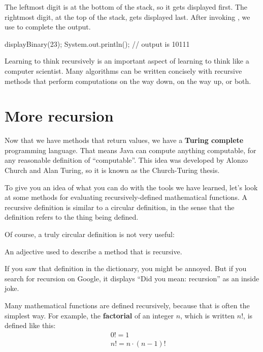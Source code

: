 The leftmost digit is at the bottom of the stack, so it gets displayed first.
The rightmost digit, at the top of the stack, gets displayed last.
After invoking , we use  to complete the output.

\begin{code}
displayBinary(23);
System.out.println();
// output is 10111
\end{code}

Learning to think recursively is an important aspect of learning to think like a computer scientist.
Many algorithms can be written concisely with recursive methods that perform computations on the way down, on the way up, or both.


\section{More recursion}
\label{factorial}



Now that we have methods that return values, we have a {\bf Turing complete} programming language.
That means Java can compute anything computable, for any reasonable definition of ``computable''.
This idea was developed by Alonzo Church and Alan Turing, so it is known as the Church-Turing thesis.


To give you an idea of what you can do with the tools we have learned, let's look at some methods for evaluating recursively-defined mathematical functions.
A recursive definition is similar to a circular definition, in the sense that the definition refers to the thing being defined.

Of course, a truly circular definition is not very useful:

\begin{description}
 An adjective used to describe a method that is recursive.
\end{description}

If you saw that definition in the dictionary, you might be annoyed.
But if you search for recursion on Google, it displays ``Did you mean: recursion'' as an inside joke.


Many mathematical functions are defined recursively, because that is often the simplest way.
For example, the {\bf factorial} of an integer $n$, which is written $n!$, is defined like this:
%
\begin{eqnarray*}
&&  0! = 1 \\
&&  n! = n \cdot(n-1)!
\end{eqnarray*}

